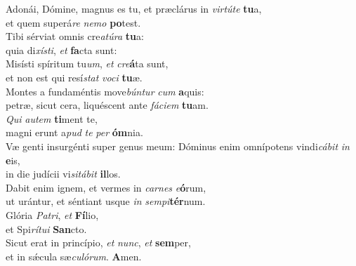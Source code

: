 \evenverse Adonái, Dómine, magnus es tu, et præclárus in \textit{vir}\textit{tú}\textit{te} \textbf{tu}a,~\*\\
\evenverse et quem superá\textit{re} \textit{ne}\textit{mo} \textbf{po}test.\\
\oddverse Tibi sérviat omnis cre\textit{a}\textit{tú}\textit{ra} \textbf{tu}a:~\*\\
\oddverse quia di\textit{xí}\textit{sti}, \textit{et} \textbf{fa}cta sunt:\\
\evenverse Misísti spíritum tu\textit{um}, \textit{et} \textit{cre}\textbf{á}ta sunt,~\*\\
\evenverse et non est qui resí\textit{stat} \textit{vo}\textit{ci} \textbf{tu}æ.\\
\oddverse Montes a fundaméntis move\textit{bún}\textit{tur} \textit{cum} \textbf{a}quis:~\*\\
\oddverse petræ, sicut cera, liquéscent ante \textit{fá}\textit{ci}\textit{em} \textbf{tu}am.\\
\evenverse \textit{Qui} \textit{au}\textit{tem} \textbf{ti}ment te,~\*\\
\evenverse magni erunt a\textit{pud} \textit{te} \textit{per} \textbf{óm}nia.\\
\oddverse Væ genti insurgénti super genus meum: Dóminus enim omnípotens vindi\textit{cá}\textit{bit} \textit{in} \textbf{e}is,~\*\\
\oddverse in die judícii vi\textit{si}\textit{tá}\textit{bit} \textbf{il}los.\\
\evenverse Dabit enim ignem, et vermes in \textit{car}\textit{nes} \textit{e}\textbf{ó}rum,~\*\\
\evenverse ut urántur, et séntiant usque \textit{in} \textit{sem}\textit{pi}\textbf{tér}num.\\
\oddverse Glória \textit{Pa}\textit{tri}, \textit{et} \textbf{Fí}lio,~\*\\
\oddverse et Spi\textit{rí}\textit{tu}\textit{i} \textbf{San}cto.\\
\evenverse Sicut erat in princípio, \textit{et} \textit{nunc}, \textit{et} \textbf{sem}per,~\*\\
\evenverse et in sǽcula sæ\textit{cu}\textit{ló}\textit{rum}. \textbf{A}men.\\

